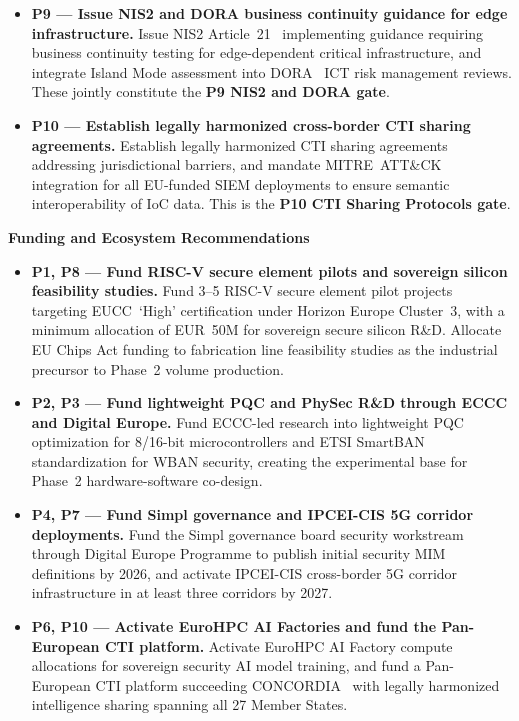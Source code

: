 \begin{itemize}
    \item \textbf{P9 --- Issue NIS2 and DORA business continuity
    guidance for edge infrastructure.}
    Issue NIS2 Article~21~\cite{nis2} implementing guidance requiring
    business continuity testing for edge-dependent critical
    infrastructure, and integrate Island Mode assessment into
    DORA~\cite{dora} ICT risk management reviews. These jointly
    constitute the \textbf{P9 NIS2 and DORA gate}.

    \item \textbf{P10 --- Establish legally harmonized cross-border CTI
    sharing agreements.}
    Establish legally harmonized CTI sharing agreements addressing
    jurisdictional barriers, and mandate MITRE~ATT\&CK integration for
    all EU-funded SIEM deployments to ensure semantic interoperability
    of IoC data. This is the \textbf{P10 CTI Sharing Protocols gate}.

\end{itemize}

\textbf{Funding and Ecosystem Recommendations}

\begin{itemize}

    \item \textbf{P1, P8 --- Fund RISC-V secure element pilots and
    sovereign silicon feasibility studies.}
    Fund 3--5 RISC-V secure element pilot projects targeting
    EUCC~`High' certification under Horizon Europe Cluster~3, with a
    minimum allocation of EUR~50M for sovereign secure silicon R\&D.
    Allocate EU Chips Act funding to fabrication line feasibility
    studies as the industrial precursor to Phase~2 volume production.

    \item \textbf{P2, P3 --- Fund lightweight PQC and PhySec R\&D
    through ECCC and Digital Europe.}
    Fund ECCC-led research into lightweight PQC optimization for
    8/16-bit microcontrollers and ETSI SmartBAN standardization for
    WBAN security, creating the experimental base for Phase~2
    hardware-software co-design.

    \item \textbf{P4, P7 --- Fund Simpl governance and IPCEI-CIS
    5G corridor deployments.}
    Fund the Simpl governance board security workstream through
    Digital Europe Programme to publish initial security MIM
    definitions by 2026, and activate IPCEI-CIS cross-border 5G
    corridor infrastructure in at least three corridors by 2027.

    \item \textbf{P6, P10 --- Activate EuroHPC AI Factories and fund
    the Pan-European CTI platform.}
    Activate EuroHPC AI Factory compute allocations for sovereign
    security AI model training, and fund a Pan-European CTI platform
    succeeding CONCORDIA~\cite{concordia} with legally harmonized
    intelligence sharing spanning all 27 Member States.

\end{itemize}

